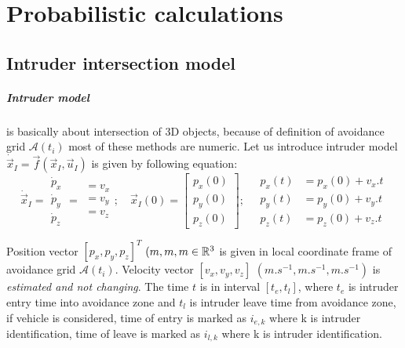 \chapter{Probabilistic calculations}

\section{Intruder intersection model}\label{sec:intruderIntersectionModel}
\noindent \paragraph{Intruder model} is basically about intersection of 3D objects, because of definition of avoidance grid $\mathscr{A}(t_i)$ most of these methods are numeric. Let us introduce intruder model $\dot{\vec{x}}_I=\vec{f}(\vec{x}_I,\vec{u}_I)$ is given by following equation:
\begin{equation}\label{eq:intruderBasicLinearModel}
    \dot{\vec{x}}_I=
    \begin{aligned}
        \dot{p}_x\\
        \dot{p}_y\\
        \dot{p}_z
    \end{aligned}
    = 
    \begin{aligned}
        =v_x\\
        =v_y\\
        =v_z
    \end{aligned}
    ;\quad
    \vec{x}_I(0)=
    \begin{bmatrix}
        p_x(0)\\
        p_y(0)\\
        p_z(0)
    \end{bmatrix}
    ;\quad
    \begin{aligned}
        p_x(t)\\
        p_y(t)\\
        p_z(t)
    \end{aligned}
    \begin{aligned}
        =p_x(0)+v_x.t\\
        =p_y(0)+v_y.t\\
        =p_z(0)+v_z.t
    \end{aligned}
\end{equation}

\noindent Position vector $[p_x,p_y,p_z]^T$  $(m,m,m\in\mathbb{R}^3$ is given in local coordinate frame of avoidance grid $\mathscr{A}(t_i)$. Velocity vector $[v_x,v_y,v_z]$ $(m.s^{-1},m.s^{-1},m.s^{-1})$ is \emph{estimated and not changing}. The time $t$ is in interval $[t_e,t_l]$, where $t_e$ is intruder entry time into avoidance zone and $t_l$ is intruder leave time from avoidance zone, if vehicle is considered, time of entry is marked as $i_{e,k}$ where k is intruder identification, time of leave is marked as $i_{l,k}$ where k is intruder identification. 

